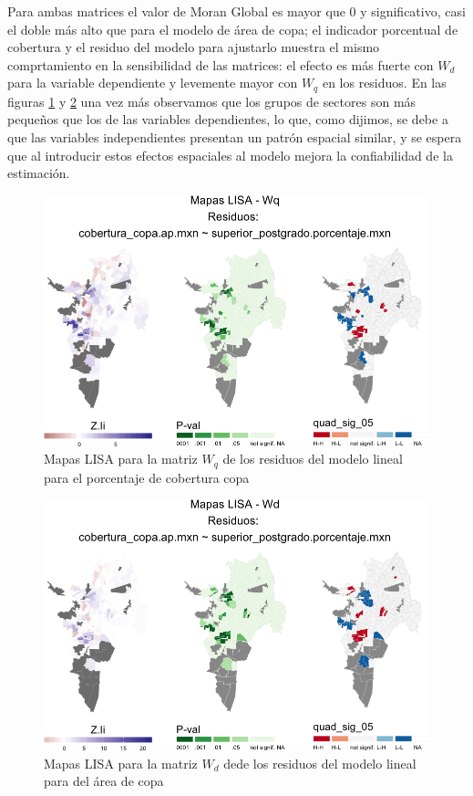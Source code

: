 \documentclass[12pt,]{book}
\begin{document}
Para ambas matrices el valor de Moran Global es mayor que 0 y
significativo, casi el doble más alto que para el modelo de área de
copa; el indicador porcentual de cobertura y el residuo del modelo para
ajustarlo muestra el mismo comprtamiento en la sensibilidad de las
matrices: el efecto es más fuerte con \(W_d\) para la variable
dependiente y levemente mayor con \(W_q\) en los residuos. En las
figuras \ref{fig:mapas-lisa-rescopaap-wq} y
\ref{fig:mapas-lisa-rescopaap-wd} una vez más observamos que los grupos
de sectores son más pequeños que los de las variables dependientes, lo
que, como dijimos, se debe a que las variables independientes presentan
un patrón espacial similar, y se espera que al introducir estos efectos
espaciales al modelo mejora la confiabilidad de la estimación.

\begin{figure}
\includegraphics[width=1\linewidth]{tesis-unigis_files/figure-latex/mapas-lisa-rescopaap-wq-1} \caption{Mapas LISA para la matriz $W_q$ de los residuos del modelo lineal para el porcentaje de cobertura copa}\label{fig:mapas-lisa-rescopaap-wq}
\end{figure}

\begin{figure}
\includegraphics[width=1\linewidth]{tesis-unigis_files/figure-latex/mapas-lisa-rescopaap-wd-1} \caption{Mapas LISA para la matriz $W_d$ dede los residuos del modelo lineal para del área de copa}\label{fig:mapas-lisa-rescopaap-wd}
\end{figure}
\end{document}
